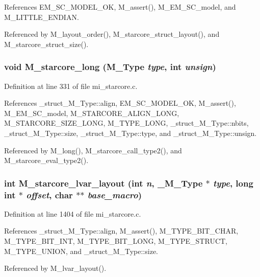 References EM\_\-SC\_\-MODEL\_\-OK, M\_\-assert(), M\_\-EM\_\-SC\_\-model, and M\_\-LITTLE\_\-ENDIAN.

Referenced by M\_\-layout\_\-order(), M\_\-starcore\_\-struct\_\-layout(), and M\_\-starcore\_\-struct\_\-size().
\subsubsection{\setlength{\rightskip}{0pt plus 5cm}void M\_\-starcore\_\-long (\bf{M\_\-Type} {\em type}, int {\em unsign})}\label{mi__starcore_8c_2d859fb42b06bdd7488f042ef7da6844}




Definition at line 331 of file mi\_\-starcore.c.

References \_\-struct\_\-M\_\-Type::align, EM\_\-SC\_\-MODEL\_\-OK, M\_\-assert(), M\_\-EM\_\-SC\_\-model, M\_\-STARCORE\_\-ALIGN\_\-LONG, M\_\-STARCORE\_\-SIZE\_\-LONG, M\_\-TYPE\_\-LONG, \_\-struct\_\-M\_\-Type::nbits, \_\-struct\_\-M\_\-Type::size, \_\-struct\_\-M\_\-Type::type, and \_\-struct\_\-M\_\-Type::unsign.

Referenced by M\_\-long(), M\_\-starcore\_\-call\_\-type2(), and M\_\-starcore\_\-eval\_\-type2().
\subsubsection{\setlength{\rightskip}{0pt plus 5cm}int M\_\-starcore\_\-lvar\_\-layout (int {\em n}, \bf{\_\-M\_\-Type} $\ast$ {\em type}, long int $\ast$ {\em offset}, char $\ast$$\ast$ {\em base\_\-macro})}\label{mi__starcore_8c_991e840b835c01147a32d63bb984c1c5}




Definition at line 1404 of file mi\_\-starcore.c.

References \_\-struct\_\-M\_\-Type::align, M\_\-assert(), M\_\-TYPE\_\-BIT\_\-CHAR, M\_\-TYPE\_\-BIT\_\-INT, M\_\-TYPE\_\-BIT\_\-LONG, M\_\-TYPE\_\-STRUCT, M\_\-TYPE\_\-UNION, and \_\-struct\_\-M\_\-Type::size.

Referenced by M\_\-lvar\_\-layout().
